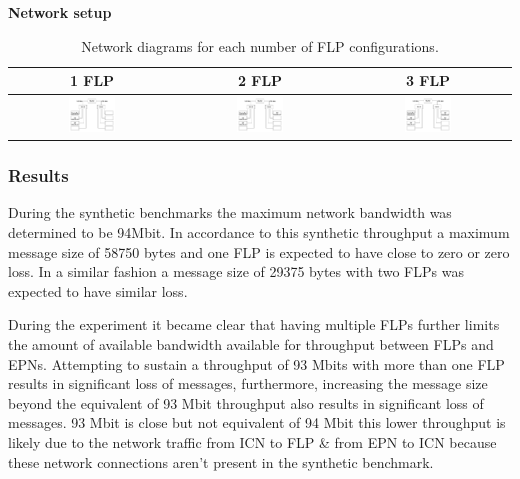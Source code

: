 \documentclass[]{article}
\begin{document}
\begin{table}[H]
	\textbf{Network setup}
	\begin{center}
		\begin{tabular}{ | c | c | c | }
			\hline
			\textbf{1 FLP} & \textbf{2 FLP} & \textbf{3 FLP} \\ \hline
			
			\includegraphics[width=0.3\textwidth]{images/network-baseline-1} & \includegraphics[width=0.3\textwidth]{images/network-baseline-2} & \includegraphics[width=0.3\textwidth]{images/network-baseline-3} \\ \hline
		\end{tabular}
		\caption{Network diagrams for each number of FLP configurations.}
		\label{tab:networksetupbaseline}
	\end{center}
\end{table}

\subsubsection{Results}
During the synthetic benchmarks the maximum network bandwidth was determined to be 94Mbit. In accordance to this synthetic throughput a maximum message size of 58750 bytes and one FLP is expected to have close to zero or zero loss. In a similar fashion a message size of 29375 bytes with two FLPs was expected to have similar loss. 

During the experiment it became clear that having multiple FLPs further limits the amount of available bandwidth available for throughput between FLPs and EPNs. Attempting to sustain a throughput of 93 Mbits with more than one FLP results in significant loss of messages, furthermore, increasing the message size beyond the equivalent of 93 Mbit throughput also results in significant loss of messages. 93 Mbit is close but not equivalent of 94 Mbit this lower throughput is likely due to the network traffic from ICN to FLP \& from EPN to ICN because these network connections aren’t present in the synthetic benchmark.
\end{document}
